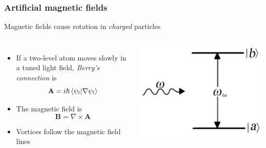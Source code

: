 \documentclass{beamer}
\begin{document}
\begin{frame}
\frametitle{Artificial magnetic fields}
\begin{center}
Magnetic fields cause rotation in \textit{charged} particles
\end{center}
\begin{columns}
\begin{itemize}
\item If a two-level atom moves slowly in a tuned light field, \textit{Berry's connection} is
$$
\mathbf{A} = i\hbar\braket{\psi_l | \nabla\psi_l}
$$
\item The magnetic field is
$$
\mathbf{B} = \nabla \times \mathbf{A}
$$
\item Vortices follow the magnetic field lines
\end{itemize}
\includegraphics[width=\textwidth]{2level.jpg}
\end{columns}
\end{frame}
\end{document}
